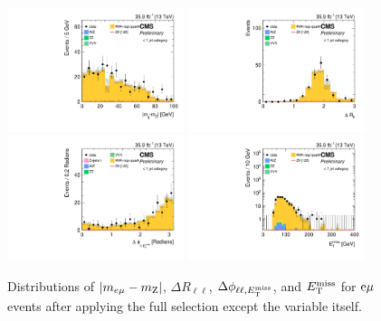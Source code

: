 \begin{figure}[!h]
 \begin{center}
   \includegraphics[width=0.46\textwidth]{figures/em_zh_1j_mll_allcutsbutone.pdf}
   \includegraphics[width=0.46\textwidth]{figures/em_zh_1j_deltarll_allcutsbutone.pdf}\\
   \includegraphics[width=0.46\textwidth]{figures/em_zh_1j_dphillmet_allcutsbutone.pdf}
   \includegraphics[width=0.46\textwidth]{figures/em_zh_1j_met_allcutsbutone.pdf}
 \end{center}
 \caption{Distributions of $|m_{e\mu}-m_{\mathrm{Z}}|$,
        $\Delta R_{\ell\ell}$,
        $\Delta \phi_{\ell\ell,E_\mathrm{T}^{\mathrm{miss}}}$,
        and $E_\mathrm{T}^{\mathrm{miss}}$ for $\mathrm{e} \mu$ events after applying the full selection except the variable itself.}
\label{fig:m_em}
\end{figure}

